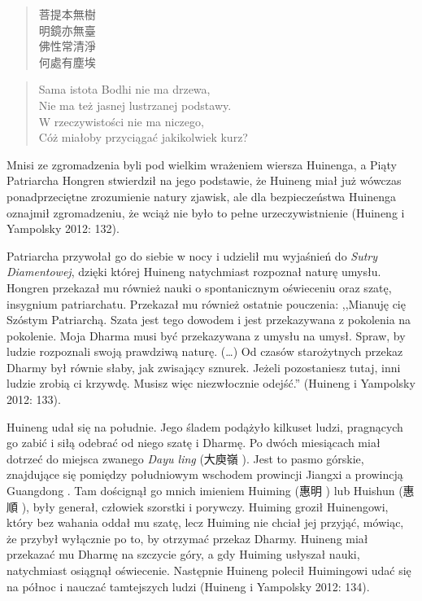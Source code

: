 \begin{minipage}[t]{0.4\textwidth}
\begin{verse}
菩提本無樹\\
明鏡亦無臺\\
佛性常清淨\\
何處有塵埃
\end{verse}
\end{minipage}
\begin{minipage}[t]{0.6\textwidth}
\itshape
\begin{verse}
Sama istota Bodhi nie ma drzewa,\\
Nie ma też jasnej lustrzanej podstawy.\\
W rzeczywistości nie ma niczego,\\
Cóż miałoby przyciągać jakikolwiek kurz?
\end{verse}
\end{minipage}
\label{HuinengVerse}
\vspace*{6pt}

Mnisi ze zgromadzenia byli pod wielkim wrażeniem wiersza Huinenga, a Piąty Patriarcha Hongren stwierdził na jego podstawie, że Huineng miał już wówczas ponadprzeciętne zrozumienie natury zjawisk, ale dla bezpieczeństwa Huinenga oznajmił zgromadzeniu, że wciąż nie było to pełne urzeczywistnienie (Huineng i Yampolsky 2012: 132).

Patriarcha przywołał go do siebie w nocy i udzielił mu wyjaśnień do \textit{Sutry Diamentowej}, dzięki której Huineng natychmiast rozpoznał naturę umysłu. Hongren przekazał mu również nauki o spontanicznym oświeceniu oraz szatę, insygnium patriarchatu. Przekazał mu również ostatnie pouczenia: ,,Mianuję cię Szóstym Patriarchą. Szata jest tego dowodem i jest przekazywana z pokolenia na pokolenie. Moja Dharma musi być przekazywana z umysłu na umysł. Spraw, by ludzie rozpoznali swoją prawdziwą naturę. (\ldots) Od czasów starożytnych przekaz Dharmy był równie słaby, jak zwisający sznurek. Jeżeli pozostaniesz tutaj, inni ludzie zrobią ci krzywdę. Musisz więc niezwłocznie odejść.'' (Huineng i Yampolsky 2012: 133).

Huineng udał się na południe. Jego śladem podążyło kilkuset ludzi, pragnących go zabić i siłą odebrać od niego szatę i Dharmę. Po dwóch miesiącach miał dotrzeć do miejsca zwanego \textit{Dayu ling} (大庾嶺 ). Jest to pasmo górskie, znajdujące się pomiędzy południowym wschodem prowincji Jiangxi  a prowincją Guangdong . Tam doścignął go mnich imieniem Huiming (惠明 ) lub Huishun (惠順 ), były generał, człowiek szorstki i porywczy. Huiming groził Huinengowi, który bez wahania oddał mu szatę, lecz Huiming nie chciał jej przyjąć, mówiąc, że przybył wyłącznie po to, by otrzymać przekaz Dharmy. Huineng miał przekazać mu Dharmę na szczycie góry, a gdy Huiming usłyszał nauki, natychmiast osiągnął oświecenie. Następnie Huineng polecił Huimingowi udać się na północ i nauczać tamtejszych ludzi (Huineng i Yampolsky 2012: 134).

